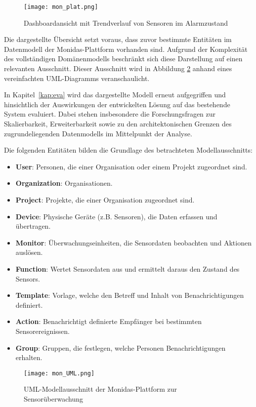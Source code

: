 \begin{figure}[H]
  \centering
  \texttt{[image: mon\_plat.png]}
 \caption{Dashboardansicht mit Trendverlauf von Sensoren im Alarmzustand}
  \label{fig:mon_plat}
\end{figure}

Die dargestellte Übersicht setzt voraus, dass zuvor bestimmte Entitäten im Datenmodell der Monidas-Plattform vorhanden sind. Aufgrund der Komplexität des vollständigen Domänenmodells beschränkt sich diese Darstellung auf einen relevanten Ausschnitt. Dieser Ausschnitt wird in Abbildung \ref{fig:mon_UML} anhand eines vereinfachten UML-Diagramms veranschaulicht.

In Kapitel~\ref{kap:eva} wird das dargestellte Modell erneut aufgegriffen und hinsichtlich der Auswirkungen der entwickelten Lösung auf das bestehende System evaluiert. Dabei stehen insbesondere die Forschungsfragen zur Skalierbarkeit, Erweiterbarkeit sowie zu den architektonischen Grenzen des zugrundeliegenden Datenmodells im Mittelpunkt der Analyse.

Die folgenden Entitäten bilden die Grundlage des betrachteten Modellausschnitts:
\begin{itemize}
  \item \textbf{User}: Personen, die einer Organisation oder einem Projekt zugeordnet sind.
  \item \textbf{Organization}: Organisationen.
  \item \textbf{Project}: Projekte, die einer Organisation zugeordnet sind.
  \item \textbf{Device}: Physische Geräte (z.B. Sensoren), die Daten erfassen und übertragen.
  \item \textbf{Monitor}: Überwachungseinheiten, die Sensordaten beobachten und Aktionen auslösen.
  \item \textbf{Function}: Wertet Sensordaten aus und ermittelt daraus den Zustand des Sensors.
  \item \textbf{Template}: Vorlage, welche den Betreff und Inhalt von Benachrichtigungen definiert.
  \item \textbf{Action}: Benachrichtigt definierte Empfänger bei bestimmten Sensorereignissen.
  \item \textbf{Group}: Gruppen, die festlegen, welche Personen Benachrichtigungen erhalten.
\end{itemize}

\begin{figure}[H]
  \centering
  \texttt{[image: mon\_UML.png]}
  \caption{UML-Modellausschnitt der Monidas-Plattform zur Sensorüberwachung}
  \label{fig:mon_UML}
\end{figure}

